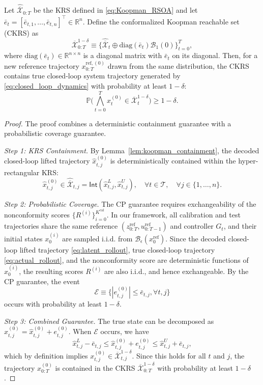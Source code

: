 \documentclass{l4dc2026}
\begin{document}
\setcounter{theorem}{0}
\begin{theorem}
\label{thm:ckrs_coverage}
Let $\hat{\overline{\mathcal{X}}}_{0:T}$ be the KRS defined in \eqref{eq:Koopman_RSOA} and let $\bar e_t = [\bar e_{t,1}, \ldots, \bar e_{t,n}]^\top \in \mathbb{R}^n$. Define the conformalized Koopman reachable set (CKRS) as
\begin{equation}
\overline{\mathcal{X}}_{0:T}^{1-\delta} \equiv \bigl\{ \hat{\overline{\mathcal{X}}}_t \oplus \mathrm{diag}(\bar e_t) \mathcal{B}_1(0) \bigr\}_{t=0}^T,
\label{eq:conformal_inflation}
\end{equation}
where $\mathrm{diag}(\bar e_t) \in \mathbb{R}^{n\times n}$ is a diagonal matrix with $\bar e_t$ on its diagonal. Then, for a new reference trajectory $x_{0:T}^{\textrm{ref}, (0)}$ drawn from the same distribution, the CKRS contains true closed-loop system trajectory generated by \eqref{eq:closed_loop_dynamics} with probability at least $1-\delta$:
\[
\mathbb{P}\Big( \bigwedge_{t=0}^T x_t^{(0)} \in \overline{\mathcal{X}}_t^{1-\delta} \Big) \ge 1-\delta.
\]
\end{theorem}

\begin{proof}
The proof combines a deterministic containment guarantee with a probabilistic coverage guarantee.

\noindent\textit{Step 1: KRS Containment.}  
By Lemma~\ref{lem:koopman_containment}, the decoded closed-loop lifted trajectory $\hat{x}_{t,j}^{(0)}$ is deterministically contained within the hyper-rectangular KRS:
\[
\hat{x}_{t,j}^{(0)} \in \hat{\overline{\mathcal{X}}}_{t,j} = \textsf{Int}(\hat{x}_{t,j}^L, \hat{x}_{t,j}^U), \quad \forall t \in \mathcal{T},\quad \forall j \in \{1,\ldots,n\}.
\]

\noindent\textit{Step 2: Probabilistic Coverage.}  
The CP guarantee requires exchangeability of the nonconformity scores $\{R^{(i)}\}_{i=0}^{K^{\mathrm{cal}}}$. In our framework, all calibration and test trajectories share the same reference $(z_{0:T}^{\mathrm{ref}}, u_{0:T-1}^{\mathrm{ref}})$ and controller $G_t$, and their initial states $x_0^{(i)}$ are sampled i.i.d. from $\mathcal{B}_\epsilon(x_0^{\mathrm{ref}})$. Since the decoded closed-loop lifted trajectory \eqref{eq:latent_rollout}, true closed-loop trajectory \eqref{eq:actual_rollout}, and the nonconformity score are deterministic functions of $x_0^{(i)}$, the resulting scores $R^{(i)}$ are also i.i.d., and hence exchangeable. By the CP guarantee, the event
\[
\mathcal{E} \equiv \{ |e_{t,j}^{(0)}| \le \bar e_{t,j}, \forall t,j \}
\]
occurs with probability at least $1-\delta$.

\noindent\textit{Step 3: Combined Guarantee.}  
The true state can be decomposed as $x_{t,j}^{(0)} = \hat{x}_{t,j}^{(0)} + e_{t,j}^{(0)}$. When $\mathcal{E}$ occurs, we have
\[
\hat{x}_{t,j}^L - \bar e_{t,j} \le \hat{x}_{t,j}^{(0)} + e_{t,j}^{(0)} \le \hat{x}_{t,j}^U + \bar e_{t,j},
\]
which by definition implies $x_{t,j}^{(0)} \in \overline{\mathcal{X}}_{t,j}^{1-\delta}$. Since this holds for all $t$ and $j$, the trajectory $x_{0:T}^{(0)}$ is contained in the CKRS $\overline{\mathcal{X}}_{0:T}^{1-\delta}$ with probability at least $1-\delta$.
\end{proof}
\end{document}
